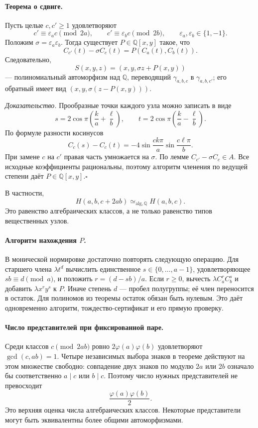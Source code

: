 \paragraph{Теорема о сдвиге.}
Пусть целые $c,c'\geq1$ удовлетворяют
\[
 c'\equiv\varepsilon_a c\pmod {2a},\qquad
 c'\equiv\varepsilon_b c\pmod {2b},\qquad
 \varepsilon_a,\varepsilon_b\in\{1,-1\}.
\]
Положим $\sigma=\varepsilon_a\varepsilon_b$. Тогда существует
$P\in\mathbb Q[x,y]$ такое, что
\[
 \boxed{\quad C_{c'}(t)-\sigma C_c(t)=P(C_a(t),C_b(t)).\quad}
\]
Следовательно,
\[
 S(x,y,z)=(x,y,\sigma z+P(x,y))
\]
--- полиномиальный автоморфизм над $\mathbb Q$, переводящий
$\gamma_{a,b,c}$ в $\gamma_{a,b,c'}$; его обратный имеет вид
$(x,y,\sigma(z-P(x,y)))$.

\emph{Доказательство.}
Прообразные точки каждого узла можно записать в виде
\[
 s=2\cos\pi\left(\frac{k}{a}+\frac{\ell}{b}\right),\qquad
 t=2\cos\pi\left(\frac{k}{a}-\frac{\ell}{b}\right).
\]
По формуле разности косинусов
\[
 C_c(s)-C_c(t)
 =-4\sin\frac{ck\pi}{a}\sin\frac{c\ell\pi}{b}.
\]
При замене $c$ на $c'$ правая часть умножается на $\sigma$.
По лемме $C_{c'}-\sigma C_c\in A$. Все исходные коэффициенты
рациональны, поэтому алгоритм членения по ведущей степени даёт
$P\in\mathbb Q[x,y]$.\hfill$\square$

В частности,
\[
 H(a,b,c+2ab)\simeq_{\mathrm{alg},\mathbb Q}H(a,b,c).
\]
Это равенство алгебраических классов, а не только равенство типов
вещественных узлов.

\paragraph{Алгоритм нахождения $P$.}
В монической нормировке достаточно повторять следующую операцию.
Для старшего члена $\lambda t^d$ вычислить единственное
$s\in\{0,\ldots,a-1\}$, удовлетворяющее $sb\equiv d\pmod a$,
и положить $r=(d-sb)/a$. Если $r\geq0$, вычесть
$\lambda C_a^rC_b^s$ и добавить $\lambda x^ry^s$ к $P$.
Иначе степень $d$ --- пробел полугруппы; её член переносится в остаток.
Для полиномов из теоремы остаток обязан быть нулевым.
Это даёт одновременно алгоритм, тождество-сертификат и его прямую проверку.

\paragraph{Число представителей при фиксированной паре.}
Среди классов $c\pmod {2ab}$ ровно $2\varphi(a)\varphi(b)$ удовлетворяют
$\gcd(c,ab)=1$. Четыре независимых выбора знаков в теореме действуют
на этом множестве свободно: совпадение двух знаков по модулю $2a$
или $2b$ означало бы соответственно $a\mid c$ или $b\mid c$.
Поэтому число нужных представителей не превосходит
\[
 \boxed{\quad \frac{\varphi(a)\varphi(b)}2.\quad}
\]
Это верхняя оценка числа алгебраических классов. Некоторые представители
могут быть эквивалентны более общими автоморфизмами.

